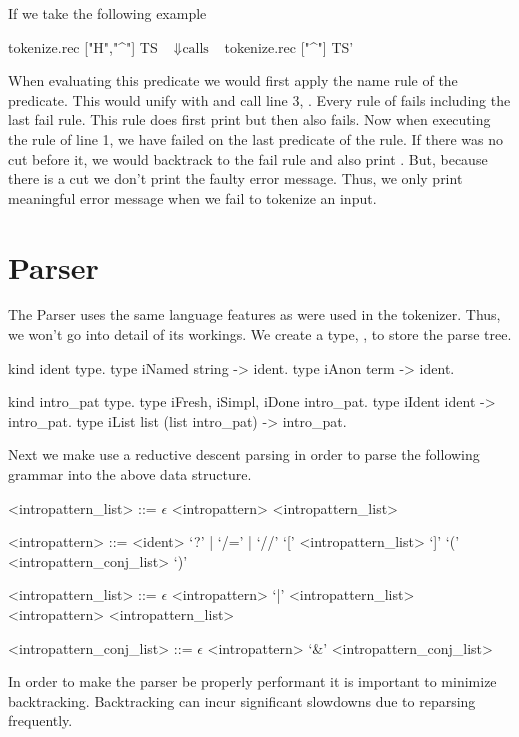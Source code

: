\documentclass[thesis.tex]{subfiles}
\begin{document}
{{If we take the following example
\begin{elpicode}
  tokenize.rec ["H","^"] TS
              ~$\Downarrow \text{calls}$~ 
  tokenize.rec ["^"] TS'
\end{elpicode}
When evaluating this predicate we would first apply the name rule of the  predicate. This would unify  with \elpii{[tName "H" | TS']} and call line 3, . Every rule of  fails including the last fail rule. This rule does first print  but then also fails. Now when executing the rule of line 1, we have failed on the last predicate of the rule. If there was no cut before it, we would backtrack to the fail rule and also print . But, because there is a cut we don't print the faulty error message. Thus, we only print meaningful error message when we fail to tokenize an input.

\section{Parser}\label{ssec:parser}
The Parser uses the same language features as were used in the tokenizer. Thus, we won't go into detail of its workings. We create a type, , to store the parse tree.
\begin{elpicode}
  kind ident type.
  type iNamed string -> ident.
  type iAnon term -> ident.

  kind intro_pat type.
  type iFresh, iSimpl, iDone intro_pat.
  type iIdent ident -> intro_pat.
  type iList list (list intro_pat) -> intro_pat.
\end{elpicode}
Next we make use a reductive descent parsing in order to parse the following grammar into the above data structure.
\begin{grammar}
  <intropattern\_list> ::= $\epsilon$
  \alt <intropattern> <intropattern\_list>

  <intropattern> ::= <ident>
  \alt `?' | `/=' | `//'
  \alt `[' <intropattern\_list> `]'
  \alt `(' <intropattern\_conj\_list> `)'

  <intropattern\_list> ::= $\epsilon$
  \alt <intropattern> `|' <intropattern\_list>
  \alt <intropattern> <intropattern\_list>

  <intropattern\_conj\_list> ::= $\epsilon$
  \alt <intropattern> `&' <intropattern\_conj\_list>
\end{grammar}
In order to make the parser be properly performant it is important to minimize backtracking. Backtracking can incur significant slowdowns due to reparsing frequently.

}}
\end{document}
